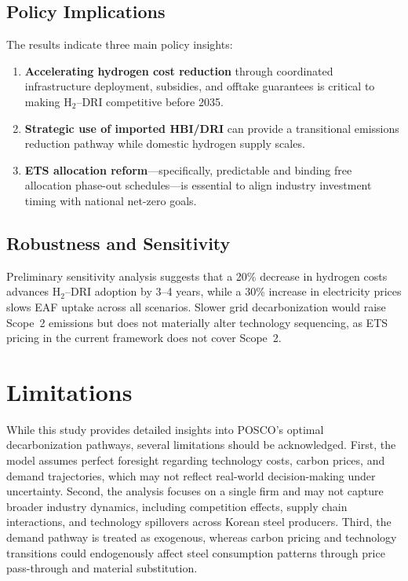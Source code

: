\documentclass[preprint,1p,authoryear]{elsarticle}
\begin{document}
\subsection{Policy Implications}
The results indicate three main policy insights:
\begin{enumerate}
    \item \textbf{Accelerating hydrogen cost reduction} through coordinated infrastructure deployment, subsidies, and offtake guarantees is critical to making H$_2$--DRI competitive before 2035.
    \item \textbf{Strategic use of imported HBI/DRI} can provide a transitional emissions reduction pathway while domestic hydrogen supply scales.
    \item \textbf{ETS allocation reform}---specifically, predictable and binding free allocation phase-out schedules---is essential to align industry investment timing with national net-zero goals.
\end{enumerate}

\subsection{Robustness and Sensitivity}
Preliminary sensitivity analysis suggests that a 20\% decrease in hydrogen costs advances H$_2$--DRI adoption by 3--4 years, while a 30\% increase in electricity prices slows EAF uptake across all scenarios. Slower grid decarbonization would raise Scope~2 emissions but does not materially alter technology sequencing, as ETS pricing in the current framework does not cover Scope~2.

\section{Limitations}

While this study provides detailed insights into POSCO's optimal decarbonization pathways, several limitations should be acknowledged. First, the model assumes perfect foresight regarding technology costs, carbon prices, and demand trajectories, which may not reflect real-world decision-making under uncertainty. Second, the analysis focuses on a single firm and may not capture broader industry dynamics, including competition effects, supply chain interactions, and technology spillovers across Korean steel producers. Third, the demand pathway is treated as exogenous, whereas carbon pricing and technology transitions could endogenously affect steel consumption patterns through price pass-through and material substitution.
\end{document}
